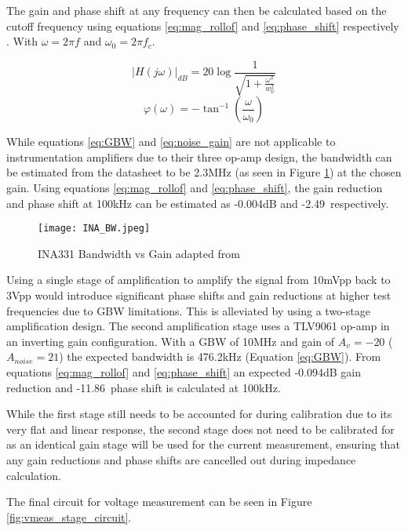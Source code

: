 The gain and phase shift at any frequency can then be calculated based on the cutoff frequency using equations \ref{eq:mag_rollof} and \ref{eq:phase_shift} respectively \cite{oljacaOperationalAmplifierGain2010}. With $\omega=2\pi f$ and $\omega_0=2\pi f_c$.

\begin{equation}
    |H(j\omega)|_{dB} = 20\log\frac{1}{\sqrt{1+\frac{\omega^2}{w_0^2}}}
    \label{eq:mag_rollof}
\end{equation}
\begin{equation}
    \varphi(\omega) = -\tan^{-1}(\frac{\omega}{\omega_0})
    \label{eq:phase_shift}
\end{equation}

While equations \ref{eq:GBW} and \ref{eq:noise_gain} are not applicable to instrumentation amplifiers due to their three op-amp design, the bandwidth can be estimated from the datasheet to be 2.3MHz (as seen in Figure \ref{fig:ina_bw}) at the chosen gain. Using equations \ref{eq:mag_rollof} and \ref{eq:phase_shift}, the gain reduction and phase shift at 100kHz can be estimated as -0.004dB and -2.49\textdegree\ respectively. 

\begin{figure}[H]
    \centering
    \texttt{[image: INA\_BW.jpeg]}
    \caption{INA331 Bandwidth vs Gain adapted from \cite{INA331}}
    \label{fig:ina_bw}
\end{figure}

Using a single stage of amplification to amplify the signal from 10mVpp back to 3Vpp would introduce significant phase shifts and gain reductions at higher test frequencies due to \ac{GBW} limitations. This is alleviated by using a two-stage amplification design. The second amplification stage uses a TLV9061 op-amp in an inverting gain configuration. With a GBW of 10MHz and gain of $A_v=-20$ ($A_{noise}=21$) the expected bandwidth is 476.2kHz (Equation \ref{eq:GBW}). From equations \ref{eq:mag_rollof} and \ref{eq:phase_shift} an expected -0.094dB gain reduction and -11.86\textdegree\ phase shift is calculated at 100kHz. 

While the first stage still needs to be accounted for during calibration due to its very flat and linear response, the second stage does not need to be calibrated for as an identical gain stage will be used for the current measurement, ensuring that any gain reductions and phase shifts are cancelled out during impedance calculation.

The final circuit for voltage measurement can be seen in Figure \ref{fig:vmeas_stage_circuit}.

